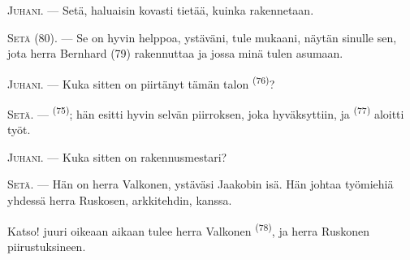 %
%
%

\VUsaut{6.0mm}
\VUsaut{1.4mm}
\VUsaut{2.2mm}

\VUsaut{3.0mm}

\textsc{Juhani}. --- Setä, haluaisin kovasti tietää, kuinka 
rakennetaan.

\textsc{Setä} (80). --- Se on hyvin helppoa, ystäväni, tule mukaani, näytän
sinulle sen, jota herra Bernhard (79) rakennuttaa ja jossa minä tulen asumaan.

\textsc{Juhani}. --- Kuka sitten on piirtänyt tämän talon
 \textsuperscript{(76)}?

\textsc{Setä}. ---  \textsuperscript{(75)}; hän esitti hyvin
selvän piirroksen, joka hyväksyttiin, ja 
\textsuperscript{(77)} aloitti työt.

\textsc{Juhani}. --- Kuka sitten on rakennusmestari?

\textsc{Setä}. --- Hän on herra Valkonen, ystäväsi Jaakobin isä. Hän johtaa
työmiehiä yhdessä herra Ruskosen, arkkitehdin, kanssa.

Katso! juuri oikeaan aikaan tulee herra Valkonen 
\textsuperscript{(78)}, ja herra Ruskonen piirustuksineen.

